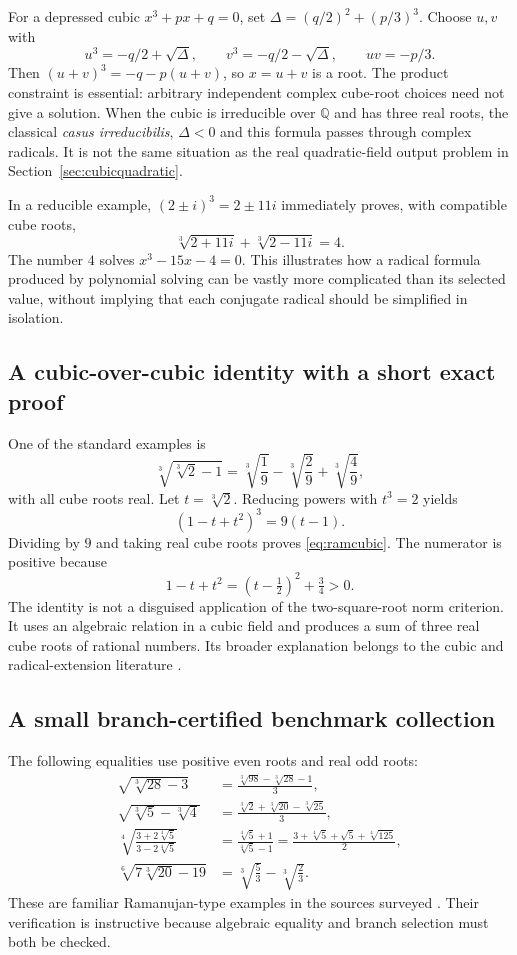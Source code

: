 \documentclass[11pt,oneside]{article}
\numberwithin{equation}{section}
\theoremstyle{definition}
\theoremstyle{remark}
\newcommand{\Q}{\mathbb{Q}}
\begin{document}
For a depressed cubic $x^3+px+q=0$, set $\Delta=(q/2)^2+(p/3)^3$. Choose $u,v$ with
\[
u^3=-q/2+\sqrt\Delta,\qquad
v^3=-q/2-\sqrt\Delta,\qquad uv=-p/3.
\]
Then $(u+v)^3=-q-p(u+v)$, so $x=u+v$ is a root. The product constraint is essential: arbitrary independent complex cube-root choices need not give a solution. When the cubic is irreducible over $\Q$ and has three real roots, the classical \emph{casus irreducibilis}, $\Delta<0$ and this formula passes through complex radicals. It is not the same situation as the real quadratic-field output problem in Section~\ref{sec:cubicquadratic}.

In a reducible example, $(2\pm i)^3=2\pm11i$ immediately proves, with compatible cube roots,
\[
\sqrt[3]{2+11i}+\sqrt[3]{2-11i}=4.
\]
The number $4$ solves $x^3-15x-4=0$. This illustrates how a radical formula produced by polynomial solving can be vastly more complicated than its selected value, without implying that each conjugate radical should be simplified in isolation.

\subsection{A cubic-over-cubic identity with a short exact proof}
One of the standard examples is
\begin{equation}\label{eq:ramcubic}
\sqrt[3]{\sqrt[3]2-1}
=\sqrt[3]{\frac19}-\sqrt[3]{\frac29}+\sqrt[3]{\frac49},
\end{equation}
with all cube roots real. Let $t=\sqrt[3]2$. Reducing powers with $t^3=2$ yields
\[
(1-t+t^2)^3=9(t-1).
\]
Dividing by $9$ and taking real cube roots proves \eqref{eq:ramcubic}. The numerator is positive because
\[
1-t+t^2=(t-\tfrac12)^2+\tfrac34>0.
\]
The identity is not a disguised application of the two-square-root norm criterion. It uses an algebraic relation in a cubic field and produces a sum of three real cube roots of rational numbers. Its broader explanation belongs to the cubic and radical-extension literature \cite{berndt98,krepkii,antipov,honsbeek}.

\subsection{A small branch-certified benchmark collection}
The following equalities use positive even roots and real odd roots:
\begin{align}
\sqrt{\sqrt[3]{28}-3}
&=\frac{\sqrt[3]{98}-\sqrt[3]{28}-1}{3},\label{eq:ram28}\\
\sqrt{\sqrt[3]5-\sqrt[3]4}
&=\frac{\sqrt[3]2+\sqrt[3]{20}-\sqrt[3]{25}}{3},\label{eq:ram5}\\
\sqrt[4]{\frac{3+2\sqrt[4]5}{3-2\sqrt[4]5}}
&=\frac{\sqrt[4]5+1}{\sqrt[4]5-1}
=\frac{3+\sqrt[4]5+\sqrt5+\sqrt[4]{125}}2,\label{eq:ram4}\\
\sqrt[6]{7\sqrt[3]{20}-19}
&=\sqrt[3]{\frac53}-\sqrt[3]{\frac23}.\label{eq:ram6}
\end{align}
These are familiar Ramanujan-type examples in the sources surveyed \cite{berndt,honsbeek,sury,osler}. Their verification is instructive because algebraic equality and branch selection must both be checked.
\end{document}
